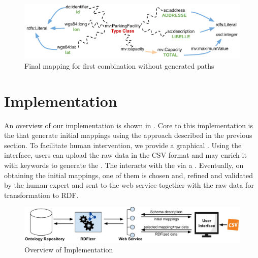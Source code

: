 



\begin{figure}
	\centering
	\includegraphics[scale=0.4]{images/combinationNoPath.pdf}
	\caption{Final mapping for first combination without generated paths}
	\label{fig:combinationNoPath}
\end{figure}

\section{Implementation}\label{sec:implementation}
An overview of our implementation is shown in . Core to this implementation is the  that generate initial mappings using the approach described in the previous section. To facilitate human intervention,
we provide a graphical . Using the interface, users can upload the raw data in the CSV format and may enrich it with keywords to generate the . The  interacts with the  via a . Eventually, on obtaining the initial mappings, one of them is chosen and, refined and validated by the human expert and sent to the web service together with the raw data for transformation to RDF.

\begin{figure}[h]
	\centering
	\includegraphics[scale=0.55]{images/OverviewImplementation.pdf}
	\caption{Overview of Implementation}
	\label{fig:OverviewImplementation}
\end{figure}

